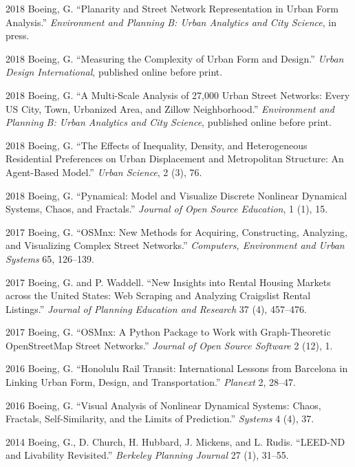 \documentclass[12pt,letterpaper]{report}
\begin{document}
	\begin{tablist}
		
		\item[2018] \tab Boeing, G. \enquote{Planarity and Street Network Representation in Urban Form Analysis.} \textit{Environment and Planning B: Urban Analytics and City Science}, in press.
		
		\item[2018] \tab Boeing, G. \enquote{Measuring the Complexity of Urban Form and Design.} \textit{Urban Design International}, published online before print.
		
		\item[2018] \tab Boeing, G. \enquote{A Multi-Scale Analysis of 27,000 Urban Street Networks: Every US City, Town, Urbanized Area, and Zillow Neighborhood.} \textit{Environment and Planning B: Urban Analytics and City Science}, published online before print.
		
		\item[2018] \tab Boeing, G. \enquote{The Effects of Inequality, Density, and Heterogeneous Residential Preferences on Urban Displacement and Metropolitan Structure: An Agent-Based Model.} \textit{Urban Science}, 2 (3), 76.
		
		\item[2018] \tab Boeing, G. \enquote{Pynamical: Model and Visualize Discrete Nonlinear Dynamical Systems, Chaos, and Fractals.} \textit{Journal of Open Source Education}, 1 (1), 15.
		
		\item[2017] \tab Boeing, G. \enquote{OSMnx: New Methods for Acquiring, Constructing, Analyzing, and Visualizing Complex Street Networks.} \textit{Computers, Environment and Urban Systems} 65, 126--139.
		
		\item[2017] \tab Boeing, G. and P. Waddell. \enquote{New Insights into Rental Housing Markets across the United States: Web Scraping and Analyzing Craigslist Rental Listings.} \textit{Journal of Planning Education and Research} 37 (4), 457--476.
		
		\item[2017] \tab Boeing, G. \enquote{OSMnx: A Python Package to Work with Graph-Theoretic OpenStreetMap Street Networks.} \textit{Journal of Open Source Software} 2 (12), 1.
		
		\item[2016] \tab Boeing, G. \enquote{Honolulu Rail Transit: International Lessons from Barcelona in Linking Urban Form, Design, and Transportation.} \textit{Planext} 2, 28--47.
		
		\item[2016] \tab Boeing, G. \enquote{Visual Analysis of Nonlinear Dynamical Systems: Chaos, Fractals, Self-Similarity, and the Limits of Prediction.} \textit{Systems} 4 (4), 37.
		
		\item[2014] \tab Boeing, G., D. Church, H. Hubbard, J. Mickens, and L. Rudis. \enquote{LEED-ND and Livability Revisited.} \textit{Berkeley Planning Journal} 27 (1), 31--55.
		
	\end{tablist}
	
\end{document}
